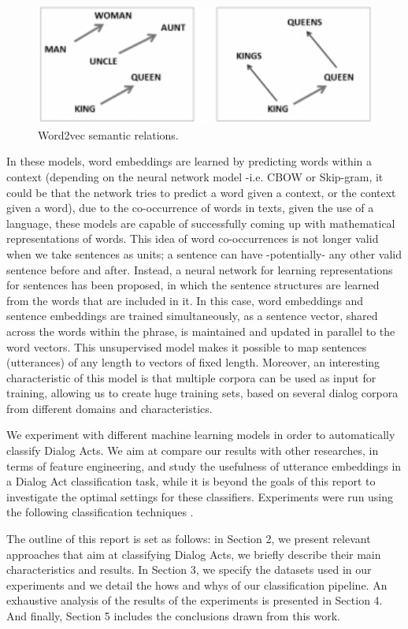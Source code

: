 \begin{figure}
\centering
\begin{minipage}{.4\textwidth}
\includegraphics[width=1\textwidth]{img/w2v_example}
\caption{Word2vec semantic relations.}
\label{fig:w2v_example}
\end{minipage}
\end{figure}

In these models, word embeddings are learned by predicting words within a context (depending on the neural network model -i.e. CBOW or Skip-gram, it could be that the network tries to predict a word given a context, or the context given a word), due to the co-occurrence of words in texts, given the use of a language, these models are capable of successfully coming up with mathematical representations of words. This idea of word co-occurrences is not longer valid when we take sentences as units; a sentence can have -potentially- any other valid sentence before and after. Instead, a neural network for learning representations for sentences has been proposed, in which the sentence structures are learned from the words that are included in it.  In this case, word embeddings and sentence embeddings are trained simultaneously, as a sentence vector, shared across the words within the phrase, is maintained and updated in parallel to the word vectors.  This unsupervised model makes it possible to map sentences (utterances) of any length to vectors of fixed length. Moreover, an interesting characteristic of this model is that multiple corpora can be used as input for training, allowing us to create huge training sets, based on several dialog corpora from different domains and characteristics.

We experiment with different machine learning models in order to automatically classify Dialog Acts. We aim at compare our results with other researches, in terms of feature engineering, and study the usefulness of utterance embeddings in a Dialog Act classification task, while it is beyond the goals of this report to investigate the optimal settings for these classifiers. Experiments were run using the following classification techniques .

The outline of this report is set as follows: in Section 2, we present relevant approaches that aim at classifying Dialog Acts, we briefly describe their main characteristics and results. In Section 3, we specify the datasets used in our experiments and we detail the hows and whys of our classification pipeline. An exhaustive analysis of the results of the experiments is presented in Section 4. And finally, Section 5 includes the conclusions drawn from this work.